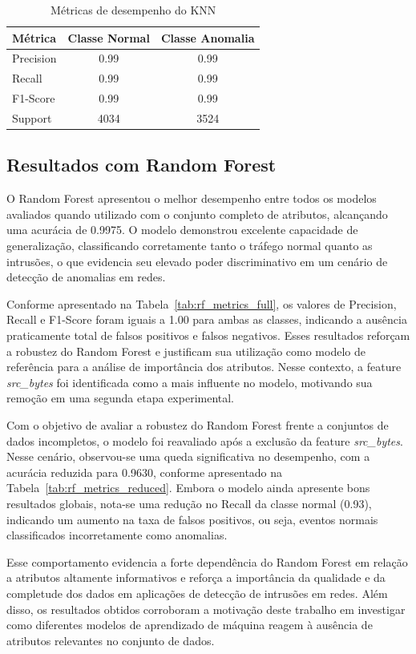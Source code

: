 \begin{table}[ht]
\centering
\caption{Métricas de desempenho do KNN}
\label{tab:knn_metrics}
\begin{tabular}{lcc}
\hline
\textbf{Métrica} & \textbf{Classe Normal} & \textbf{Classe Anomalia} \\
\hline
Precision & 0.99 & 0.99 \\
Recall    & 0.99 & 0.99 \\
F1-Score  & 0.99 & 0.99 \\
Support   & 4034 & 3524 \\
\hline
\end{tabular}
\end{table}

\subsection{Resultados com Random Forest}

O Random Forest apresentou o melhor desempenho entre todos os modelos avaliados quando
utilizado com o conjunto completo de atributos, alcançando uma acurácia de 0.9975. O
modelo demonstrou excelente capacidade de generalização, classificando corretamente
tanto o tráfego normal quanto as intrusões, o que evidencia seu elevado poder
discriminativo em um cenário de detecção de anomalias em redes.

Conforme apresentado na Tabela~\ref{tab:rf_metrics_full}, os valores de Precision,
Recall e F1-Score foram iguais a 1.00 para ambas as classes, indicando a ausência
praticamente total de falsos positivos e falsos negativos. Esses resultados reforçam a
robustez do Random Forest e justificam sua utilização como modelo de referência para a
análise de importância dos atributos. Nesse contexto, a feature \textit{src\_bytes} foi
identificada como a mais influente no modelo, motivando sua remoção em uma segunda etapa
experimental.

Com o objetivo de avaliar a robustez do Random Forest frente a conjuntos de dados
incompletos, o modelo foi reavaliado após a exclusão da feature \textit{src\_bytes}.
Nesse cenário, observou-se uma queda significativa no desempenho, com a acurácia
reduzida para 0.9630, conforme apresentado na Tabela~\ref{tab:rf_metrics_reduced}.
Embora o modelo ainda apresente bons resultados globais, nota-se uma redução no Recall
da classe normal (0.93), indicando um aumento na taxa de falsos positivos, ou seja,
eventos normais classificados incorretamente como anomalias.

Esse comportamento evidencia a forte dependência do Random Forest em relação a
atributos altamente informativos e reforça a importância da qualidade e da completude
dos dados em aplicações de detecção de intrusões em redes. Além disso, os resultados
obtidos corroboram a motivação deste trabalho em investigar como diferentes modelos de
aprendizado de máquina reagem à ausência de atributos relevantes no conjunto de dados.

